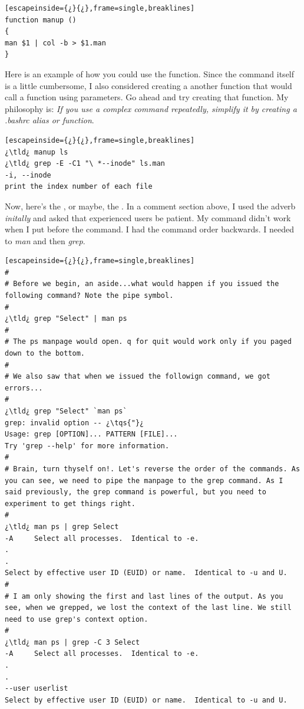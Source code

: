 \begin{lstlisting}[escapeinside={¿}{¿},frame=single,breaklines]
function manup ()
{
man $1 | col -b > $1.man
}
\end{lstlisting}

Here is an example of how you could use the function. Since the command itself is a little cumbersome, I also considered creating a another function that would call a function using parameters. Go ahead and try creating that function. My philosophy is: \textit{If you use a complex command repeatedly, simplify it by creating a \emph{.bashrc} alias or function}.

\begin{lstlisting}[escapeinside={¿}{¿},frame=single,breaklines]
¿\tld¿ manup ls
¿\tld¿ grep -E -C1 "\ *--inode" ls.man
-i, --inode
print the index number of each file
\end{lstlisting}

Now, here's the , or maybe, the . In a comment section above, I used the adverb \emph{initally} and asked that experienced users be patient. My command didn't work when I put  before the command. I had the command order backwards. I needed to \emph{man} and then \emph{grep}.

\begin{lstlisting}[escapeinside={¿}{¿},frame=single,breaklines]
#
# Before we begin, an aside...what would happen if you issued the following command? Note the pipe symbol.
#
¿\tld¿ grep "Select" | man ps
#
# The ps manpage would open. q for quit would work only if you paged down to the bottom.
#
# We also saw that when we issued the followign command, we got errors...
#
¿\tld¿ grep "Select" `man ps`
grep: invalid option -- ¿\tqs{"}¿
Usage: grep [OPTION]... PATTERN [FILE]...
Try 'grep --help' for more information.
# 
# Brain, turn thyself on!. Let's reverse the order of the commands. As you can see, we need to pipe the manpage to the grep command. As I said previously, the grep command is powerful, but you need to experiment to get things right.
#
¿\tld¿ man ps | grep Select
-A     Select all processes.  Identical to -e.
.
.
Select by effective user ID (EUID) or name.  Identical to -u and U.
#
# I am only showing the first and last lines of the output. As you see, when we grepped, we lost the context of the last line. We still need to use grep's context option.
#
¿\tld¿ man ps | grep -C 3 Select
-A     Select all processes.  Identical to -e.
.
.
--user userlist
Select by effective user ID (EUID) or name.  Identical to -u and U.
\end{lstlisting}

